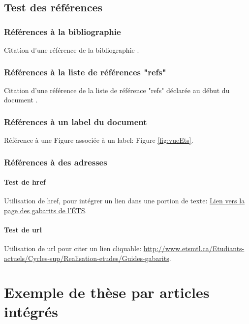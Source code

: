 \documentclass[letterpaper%
, twoside%
, 12pt%
,these%
,francais
,creativecommons,hyperref%
]{thETS}
\begin{document}
\section{Test des références}

\subsection{Références à la bibliographie}

Citation d'une référence de la bibliographie \citep{BookExample}.

\subsection{Références à la liste de références "refs"}

Citation d'une référence de la liste de référence "refs" déclarée au début du document .

\subsection{Références à un label du document}

Référence à une Figure associée à un label: Figure \ref{fig:vueEts}.

\subsection{Références à des adresses}

\subsubsection{Test de href}

Utilisation de href, pour intégrer un lien dans une portion de texte:
\href{http://www.etsmtl.ca/Etudiants-actuels/Cycles-sup/Realisation-etudes/Guides-gabarits}{Lien vers la page des gabarits de l'ÉTS}.

\subsubsection{Test de url}

Utilisation de url pour citer un lien cliquable:
\url{http://www.etsmtl.ca/Etudiants-actuels/Cycles-sup/Realisation-etudes/Guides-gabarits}.

\chapter{Exemple de thèse par articles intégrés}
\end{document}
